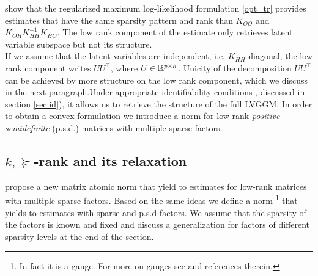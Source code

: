 \citet{chandrasekaran2010} show that the regularized maximum log-likelihood formulation \ref{opt_tr} provides estimates  that have the same sparsity pattern and rank than $K_{OO}$ and $K_{OH}K_{HH}^{-1}K_{HO}$. The low rank component of the estimate only retrieves latent variable subspace but not its structure.\\

If we assume that the latent variables are independent, i.e. $K_{HH}$ diagonal, the low rank component writes $UU^{\top}$, where $U\in\mathbb{R}^{p\times h}$. Unicity of the decomposition $UU^{\top}$ can be achieved by more structure on the low rank component, which we discuss in the next paragraph.Under appropriate identifiability conditions , discussed in section \ref{sec:id}), it allows us to retrieve the structure of the full LVGGM. In order to obtain a convex formulation we introduce a norm for low rank \textit{positive semidefinite} (p.s.d.) matrices with multiple sparse factors. 

 


%

\subsection{$k,\succeq$-rank and its relaxation}
\label{subsec:norm}

\citet{richard2014tight} propose a new matrix atomic norm that yield to estimates for low-rank matrices with multiple sparse factors. Based on the same ideas we define a norm \footnote{In fact it is a gauge. For more on gauges see \citet{chandrasekaran2010convex} and references therein.}  that yields to estimates with sparse and p.s.d factors. We assume that the sparsity of the factors is known and fixed and discuss a generalization for factors of different sparsity levels at the end of the section.

